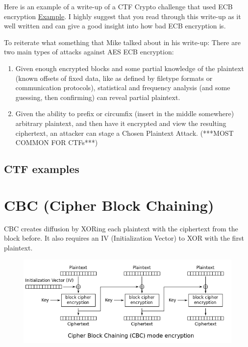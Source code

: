 \documentclass{report}
\begin{document}
Here is an example of a write-up of a CTF Crypto challenge that used ECB encryption
\href{https://michael-myers.github.io/blog/post/enigma2017-broken-encryption-writeup/}{Example}.  I highly suggest that you read through this write-up as it well written and can give a good insight into how bad ECB encryption is.

To reiterate what something that Mike talked about in his write-up: There are two main types of attacks against AES ECB encryption:
\begin{enumerate}
\item Given enough encrypted blocks and some partial knowledge of the plaintext (known offsets of fixed data, like as defined by filetype formats or communication protocols), statistical and frequency analysis (and some guessing, then confirming) can reveal partial plaintext.
\item Given the ability to prefix or circumfix (insert in the middle somewhere) arbitrary plaintext, and then have it encrypted and view the resulting ciphertext, an attacker can stage a Chosen Plaintext Attack.  (***MOST COMMON FOR CTFs***)
\end{enumerate}

\subsection{CTF examples}



\section{CBC (Cipher Block Chaining)}
CBC creates diffusion by XORing each plaintext with the ciphertext from the block before.  It also requires an IV (Initialization Vector) to XOR with the first plaintext.
\begin{figure}[h!]
  \includegraphics[width=\linewidth]{CBC_Walkthrough_.png}
\end{figure}
\end{document}
